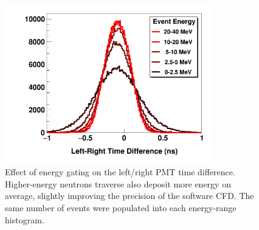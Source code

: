 
\begin{figure}[tb]
    \centering
    \includegraphics[width=0.8\textwidth]{figures/LRDifferenceByEnergy.png}
    \caption[Effect of energy gating on left/right PMT time difference]
    {
        Effect of energy gating on the left/right PMT time difference. Higher-energy neutrons 
        traverse also deposit more energy on average, slightly improving the
        precision of the software CFD. The same number of events were populated into each
        energy-range histogram.
    }
    \label{LRTimeDifferenceByEnergy}
\end{figure}


